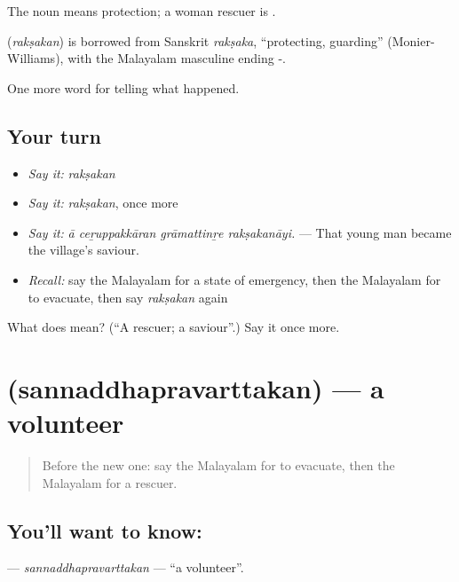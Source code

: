 The noun  means protection; a woman rescuer is .

\begin{cousinweb}
\textbf{} (\emph{rakṣakan}) is borrowed from Sanskrit \emph{rakṣaka}, \textquotedblleft{}protecting, guarding\textquotedblright{} (Monier-Williams), with the Malayalam masculine ending -.
\end{cousinweb}

\begin{grammarlens}[title={What you've built}]
One more word for telling what happened.
\end{grammarlens}

\subsection*{Your turn}
\begin{itemize}
\raggedright
  \item \emph{Say it:} \emph{rakṣakan}
  \item \emph{Say it:} \emph{rakṣakan}, once more
  \item \emph{Say it:} \emph{ā ceṟuppakkāran grāmattinṟe rakṣakanāyi.} — That young man became the village's saviour.
  \item \emph{Recall:} say the Malayalam for a state of emergency, then the Malayalam for to evacuate, then say \emph{rakṣakan} again
\end{itemize}

\begin{tcolorbox}[breakable,colback=teal!4,colframe=teal!35!black,title={Before you move on}]
What does  mean? (\textquotedblleft{}A rescuer; a saviour\textquotedblright{}.) Say it once more.
\end{tcolorbox}
\section[\texorpdfstring{\ml{സന്നദ്ധപ്രവർത്തകൻ} (sannaddhapravarttakan)}{സന്നദ്ധപ്രവർത്തകൻ (sannaddhapravarttakan)}]{ (sannaddhapravarttakan) — a volunteer}

\label{lesson:ML-C375-sannaddhapravarttakan}



\begin{quote}
Before the new one: say the Malayalam for to evacuate, then the Malayalam for a rescuer.
\end{quote}

\subsection*{You'll want to know: }
\textbf{} — \emph{sannaddhapravarttakan} — \textquotedblleft{}a volunteer\textquotedblright{}.


